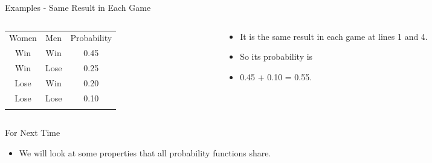 \documentclass[
  ignorenonframetext,
]{beamer}
\providecommand{\tightlist}{%
  \setlength{\itemsep}{0pt}\setlength{\parskip}{0pt}}
\renewcommand{\,}{\text{, }}
\begin{document}
\begin{frame}{Examples - Same Result in Each Game}
\protect\hypertarget{examples---same-result-in-each-game}{}
\begin{columns}[T]
\begin{column}{0.48\textwidth}
\begin{longtable}[]{@{}ccc@{}}
\toprule
Women & Men & Probability \\ \addlinespace
\midrule
\endhead
Win & Win & 0.45 \\ \addlinespace
Win & Lose & 0.25 \\ \addlinespace
Lose & Win & 0.20 \\ \addlinespace
Lose & Lose & 0.10 \\ \addlinespace
\bottomrule
\end{longtable}
\end{column}

\begin{column}{0.48\textwidth}
\bigskip

\begin{itemize}
\tightlist
\item
  It is the same result in each game at lines 1 and 4.
\item
  So its probability is
\item
  0.45 + 0.10 = 0.55.
\end{itemize}
\end{column}
\end{columns}
\end{frame}

\begin{frame}{For Next Time}
\protect\hypertarget{for-next-time}{}
\begin{itemize}
\tightlist
\item
  We will look at some properties that all probability functions share.
\end{itemize}
\end{frame}
\end{document}
